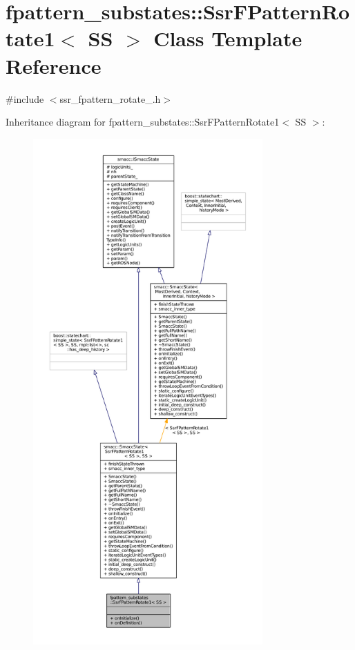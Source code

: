 \hypertarget{structfpattern__substates_1_1SsrFPatternRotate1}{}\section{fpattern\+\_\+substates\+:\+:Ssr\+F\+Pattern\+Rotate1$<$ SS $>$ Class Template Reference}
\label{structfpattern__substates_1_1SsrFPatternRotate1}


{\ttfamily \#include $<$ssr\+\_\+fpattern\+\_\+rotate\+\_.\+h$>$}



Inheritance diagram for fpattern\+\_\+substates\+:\+:Ssr\+F\+Pattern\+Rotate1$<$ SS $>$\+:
\nopagebreak
\begin{figure}[H]
\begin{center}
\leavevmode
\includegraphics[height=550pt]{structfpattern__substates_1_1SsrFPatternRotate1__inherit__graph}
\end{center}
\end{figure}


